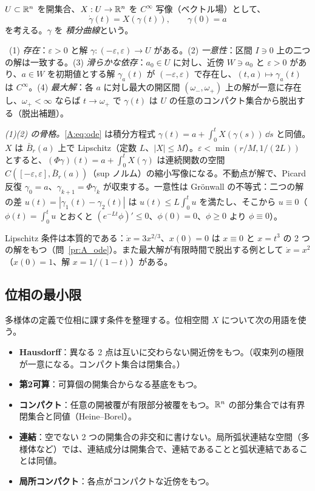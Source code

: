 $U\subset\mathbb R^n$ を開集合、$X:U\to\mathbb R^n$ を $C^\infty$ 写像（ベクトル場）として、
\begin{equation}\label{A:eq:ode}
\dot\gamma(t)=X(\gamma(t)),\qquad\gamma(0)=a
\end{equation}
を考える。$\gamma$ を \emph{積分曲線}という。

\begin{thm}\label{A:thm:ode}
\tC\ (1) \emph{存在}：$\varepsilon>0$ と解 $\gamma:(-\varepsilon,\varepsilon)\to U$ がある。(2) \emph{一意性}：区間 $I\ni0$ 上の二つの解は一致する。(3) \emph{滑らかな依存}：$a_0\in U$ に対し、近傍 $W\ni a_0$ と $\varepsilon>0$ があり、$a\in W$ を初期値とする解 $\gamma_a(t)$ が $(-\varepsilon,\varepsilon)$ で存在し、$(t,a)\mapsto\gamma_a(t)$ は $C^\infty$。(4) \emph{最大解}：各 $a$ に対し最大の開区間 $(\omega_-,\omega_+)$ 上の解が一意に存在し、$\omega_+<\infty$ ならば $t\to\omega_+$ で $\gamma(t)$ は $U$ の任意のコンパクト集合から脱出する（脱出補題）。
\end{thm}

\emph{(1)(2) の骨格。}\eqref{A:eq:ode} は積分方程式 $\gamma(t)=a+\int_0^tX(\gamma(s))\,\dd s$ と同値。$X$ は $\bar B_r(a)$ 上で Lipschitz（定数 $L$、$|X|\le M$）。$\varepsilon<\min(r/M,1/(2L))$ とすると、$(\Phi\gamma)(t)=a+\int_0^tX(\gamma)$ は連続関数の空間 $C([-\varepsilon,\varepsilon],\bar B_r(a))$（sup ノルム）の縮小写像になる。不動点が解で、Picard 反復 $\gamma_0=a$、$\gamma_{k+1}=\Phi\gamma_k$ が収束する。一意性は Grönwall の不等式：二つの解の差 $u(t)=|\gamma_1(t)-\gamma_2(t)|$ は $u(t)\le L\int_0^tu$ を満たし、そこから $u\equiv0$（$\phi(t)=\int_0^tu$ とおくと $(e^{-Lt}\phi)'\le0$、$\phi(0)=0$、$\phi\ge0$ より $\phi\equiv0$）。

Lipschitz 条件は本質的である：$\dot x=3x^{2/3}$、$x(0)=0$ は $x\equiv0$ と $x=t^3$ の 2 つの解をもつ（問~\ref{pr:A_ode}）。また最大解が有限時間で脱出する例として $\dot x=x^2$（$x(0)=1$、解 $x=1/(1-t)$）がある。

\subsection{位相の最小限}
多様体の定義で位相に課す条件を整理する。位相空間 $X$ について次の用語を使う。

\begin{itemize}
\item \textbf{Hausdorff}：異なる 2 点は互いに交わらない開近傍をもつ。（収束列の極限が一意になる。コンパクト集合は閉集合。）
\item \textbf{第2可算}：可算個の開集合からなる基底をもつ。
\item \textbf{コンパクト}：任意の開被覆が有限部分被覆をもつ。$\mathbb R^n$ の部分集合では有界閉集合と同値（Heine--Borel）。
\item \textbf{連結}：空でない 2 つの開集合の非交和に書けない。局所弧状連結な空間（多様体など）では、連結成分は開集合で、連結であることと弧状連結であることは同値。
\item \textbf{局所コンパクト}：各点がコンパクトな近傍をもつ。
\end{itemize}

